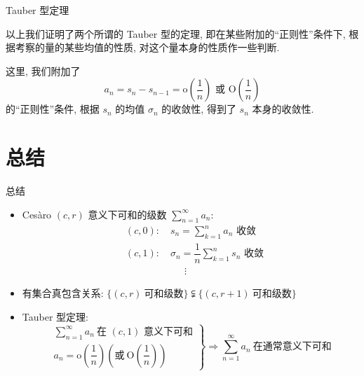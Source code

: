 
\begin{frame}{Tauber 型定理}

以上我们证明了两个所谓的 Tauber 型的定理, 即在某些附加的“正则性”条件下, 根据考察的量的某些均值的性质, 对这个量本身的性质作一些判断.

\pause
\vspace{1em}

这里, 我们附加了
\[a_n = s_n - s_{n-1} = \mathrm{o}\left(\dfrac{1}{n}\right) \text{ 或 } \mathrm{O}\left(\dfrac{1}{n}\right)\]
的“正则性”条件, 根据 $s_n$ 的均值 $\sigma_n$ 的收敛性, 得到了 $s_n$ 本身的收敛性.

\end{frame}


\section{总结}


\begin{frame}{总结}

\begin{itemize}
\item[{\larger[2] \color{red} \ding{43}}] Cesàro $(c, r)$ 意义下可和的级数 $\sum\limits_{n=1}^\infty a_n:$
\begin{align*}
& (c, 0): \quad s_n = \sum\limits_{k=1}^n a_n \text{ 收敛} \\
& (c, 1): \quad \sigma_n = \dfrac{1}{n} \sum\limits_{k=1}^n s_n \text{ 收敛} \\
& \phantom{++++++} \vdots
\end{align*}
\vspace{-0.8em}
\pause
\item[{\larger[2] \color{red} \ding{43}}] 有集合真包含关系: $\{ (c, r) ~ \text{可和级数} \} \subsetneqq \{ (c, r + 1) ~ \text{可和级数} \}$
\pause
\vspace{0.8em}
\item[{\larger[2] \color{red} \ding{43}}] Tauber 型定理:
\[
\left. \begin{array}{r}
\sum\limits_{n=1}^\infty a_n ~ \text{在 $(c,1)$ 意义下可和} \\
a_n = \mathrm{o} \left( \dfrac{1}{n} \right) (\text{或} ~ \mathrm{O} \left( \dfrac{1}{n} \right))
\end{array} \right\} \Longrightarrow \sum\limits_{n=1}^\infty a_n ~ \text{在通常意义下可和}
\]
\end{itemize}

\end{frame}

